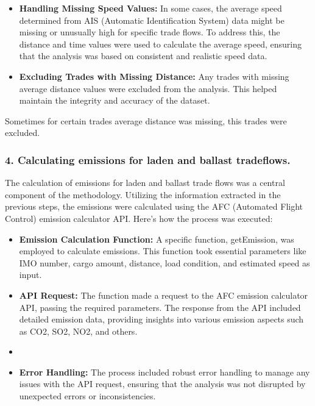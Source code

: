 \begin{itemize}
    \item \textbf{Handling Missing Speed Values:} In some cases, the average speed determined from AIS (Automatic Identification System) data might be missing or unusually high for specific trade flows. To address this, the distance and time values were used to calculate the average speed, ensuring that the analysis was based on consistent and realistic speed data.
    
    \item \textbf{Excluding Trades with Missing Distance:} Any trades with missing average distance values were excluded from the analysis. This helped maintain the integrity and accuracy of the dataset.
    
\end{itemize}


Sometimes for certain trades average distance was missing, this trades were excluded.

\subsubsection{4. Calculating emissions for laden and ballast tradeflows.}

The calculation of emissions for laden and ballast trade flows was a central component of the methodology. Utilizing the information extracted in the previous steps, the emissions were calculated using the AFC (Automated Flight Control) emission calculator API. Here's how the process was executed:

\begin{itemize}
    \item \textbf{Emission Calculation Function:} A specific function, getEmission, was employed to calculate emissions. This function took essential parameters like IMO number, cargo amount, distance, load condition, and estimated speed as input.
    
    \item \textbf{API Request:} The function made a request to the AFC emission calculator API, passing the required parameters. The response from the API included detailed emission data, providing insights into various emission aspects such as CO2, SO2, NO2, and others.
    \item 
    \item \textbf{Error Handling:} The process included robust error handling to manage any issues with the API request, ensuring that the analysis was not disrupted by unexpected errors or inconsistencies.
    
    
\end{itemize}


